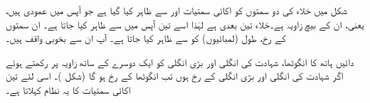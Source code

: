 شکل    میں خلاء کی دو سمتوں کو  اکائی سمتیات  اور  سے ظاہر کیا گیا ہے جو آپس میں عمودی ہیں، یعنی، ان کے بیچ   زاویہ ہے۔خلاء تین بعدی ہے لہٰذا اسے تین آپس میں  سے ظاہر کیا جاتا ہے۔ ان سمتوں کے رخ،  طول (لمبائیوں)  کو  سے ظاہر کیا جاتا ہے۔ آپ ان سے بخوبی واقف ہیں۔ 

 دائیں ہاتھ کا انگوٹھا، شہادت کی انگلی اور  بڑی انگلی کو ایک دوسرے کے ساتھ  زاویہ پر رکھتے ہوئے اگر شہادت کی انگلی  اور بڑی انگلی  کے رخ ہوں تب انگوٹھا  کے رخ ہو گا (شکل )۔ اسی لئے  تین اکائی سمتیات کا یہ نظام   کہلاتا ہے۔

